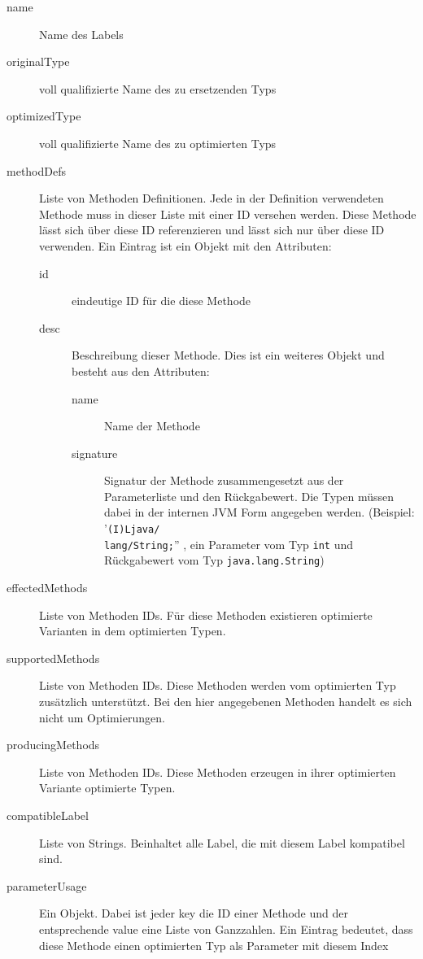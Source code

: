\begin{description}
	\item[name] Name des Labels
	\item[originalType] voll qualifizierte Name des zu ersetzenden Typs
	\item[optimizedType] voll qualifizierte Name des zu optimierten Typs
	\item[methodDefs] Liste von Methoden Definitionen. Jede in der Definition verwendeten Methode muss
	in dieser Liste mit einer ID versehen werden. Diese Methode lässt sich über diese
	ID referenzieren und lässt sich nur über diese ID verwenden. Ein Eintrag ist ein Objekt mit
	den Attributen:
	\begin{description}
		\item[id] eindeutige ID für die diese Methode
		\item[desc] Beschreibung dieser Methode. Dies ist ein weiteres Objekt 
		und besteht aus den Attributen:
		\begin{description}
			\item[name] Name der Methode
			\item[signature] Signatur der Methode zusammengesetzt aus der
			Parameterliste und den Rückgabewert. Die Typen müssen dabei in der 
			internen JVM Form angegeben werden. (Beispiel: '\texttt{(I)Ljava/\\lang/String;}''
			, ein Parameter vom Typ \texttt{int} und Rückgabewert vom Typ
			\texttt{java.lang.String})
		\end{description}	
	\end{description}
	\item[effectedMethods] Liste von Methoden IDs. Für diese Methoden existieren 
	optimierte Varianten in dem optimierten Typen.
	\item[supportedMethods] Liste von Methoden IDs. Diese Methoden werden vom
	optimierten Typ zusätzlich unterstützt. Bei den hier angegebenen Methoden handelt 
	es sich nicht um Optimierungen.
	\item[producingMethods] Liste von Methoden IDs. Diese Methoden erzeugen 
	in ihrer optimierten Variante optimierte Typen.
	\item[compatibleLabel] Liste von Strings. Beinhaltet alle Label, die mit diesem Label
	kompatibel sind.
	\item[parameterUsage] Ein Objekt. Dabei ist jeder key die ID einer Methode 
	und der entsprechende value eine Liste von Ganzzahlen. Ein Eintrag bedeutet, 
	dass diese Methode einen optimierten Typ als Parameter mit diesem Index 

\end{description}
